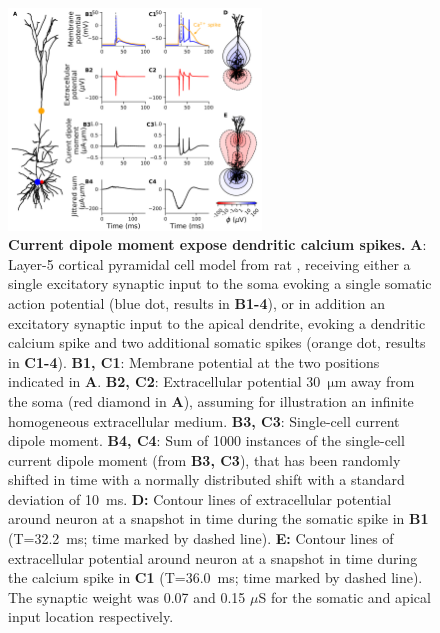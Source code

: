 \documentclass[preprint,10pt,authoryear]{elsarticle}
\begin{document}
\begin{figure}[H]
	\centering
	\includegraphics[width=0.6\textwidth]{ca_spike_hay}
	\caption{\textbf{Current dipole moment expose dendritic calcium spikes.}
		\textbf{A}: Layer-5 cortical pyramidal cell model from rat \citep{HAY2011}, receiving either a single excitatory synaptic input to the soma evoking a single somatic action potential (blue dot, results in \textbf{B1-4}), or in addition an excitatory synaptic input to the apical dendrite, evoking a dendritic calcium spike and two additional somatic spikes (orange dot, results in \textbf{C1-4}). 
		\textbf{B1, C1}: Membrane potential at the two positions indicated in \textbf{A}.
		\textbf{B2, C2}: Extracellular potential 30~$\si{\um}$ away from the soma (red diamond in \textbf{A}), assuming for illustration an infinite homogeneous extracellular medium. 
		\textbf{B3, C3}: Single-cell current dipole moment. 
		\textbf{B4, C4}: Sum of 1000 instances of the single-cell current dipole moment (from \textbf{B3, C3}), that has been randomly shifted in time with a normally distributed shift with a standard deviation of 10~ms. 
\textbf{D:} Contour lines of extracellular potential around neuron at a snapshot in time during the somatic spike in \textbf{B1} (T=32.2~ms; time marked by dashed line).
\textbf{E:} Contour lines of extracellular potential around neuron at a snapshot in time during the calcium spike in \textbf{C1} (T=36.0~ms; time marked by dashed line).
The synaptic weight was 0.07 and 0.15 $\mu$S for the somatic and apical input location respectively.
	}
	\label{fig:ca_spike}
\end{figure}
\end{document}
